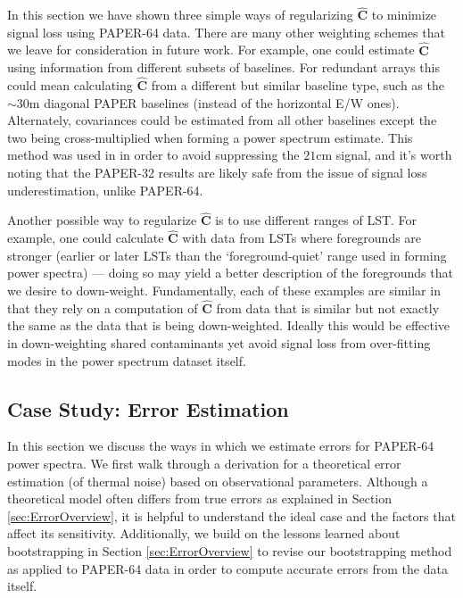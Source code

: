 \documentclass[preprint2,numberedappendix,tighten]{aastex6}  %
\begin{document}
In this section we have shown three simple ways of regularizing $\hat{\textbf{C}}$ to minimize signal loss using PAPER-64 data. There are many other weighting schemes that we leave for consideration in future work. For example, one could estimate $\hat{\textbf{C}}$ using information from different subsets of baselines. For redundant arrays this could mean calculating $\hat{\textbf{C}}$ from a different but similar baseline type, such as the $\sim30$m diagonal PAPER baselines (instead of the horizontal E/W ones). Alternately, covariances could be estimated from all other baselines except the two being cross-multiplied when forming a power spectrum estimate. This method was used in \citet{parsons_et_al2014} in order to avoid suppressing the $21$cm signal, and it's worth noting that the PAPER-32 results are likely safe from the issue of signal loss underestimation, unlike PAPER-64. 

Another possible way to regularize $\hat{\textbf{C}}$ is to use different ranges of LST. For example, one could calculate $\hat{\textbf{C}}$ with data from LSTs where foregrounds are stronger (earlier or later LSTs than the `foreground-quiet' range used in forming power spectra) --- doing so may yield a better description of the foregrounds that we desire to down-weight. Fundamentally, each of these examples are similar in that they rely on a computation of $\hat{\textbf{C}}$ from data that is similar but not exactly the same as the data that is being down-weighted. Ideally this would be effective in down-weighting shared contaminants yet avoid signal loss from over-fitting modes in the power spectrum dataset itself. 


\subsection{Case Study: Error Estimation}
\label{sec:Error}

In this section we discuss the ways in which we estimate errors for PAPER-64 power spectra. We first walk through a derivation for a theoretical error estimation (of thermal noise) based on observational parameters. Although a theoretical model often differs from true errors as explained in Section \ref{sec:ErrorOverview}, it is helpful to understand the ideal case and the factors that affect its sensitivity. Additionally, we build on the lessons learned about bootstrapping in Section \ref{sec:ErrorOverview} to revise our bootstrapping method as applied to PAPER-64 data in order to compute accurate errors from the data itself.
\end{document}
